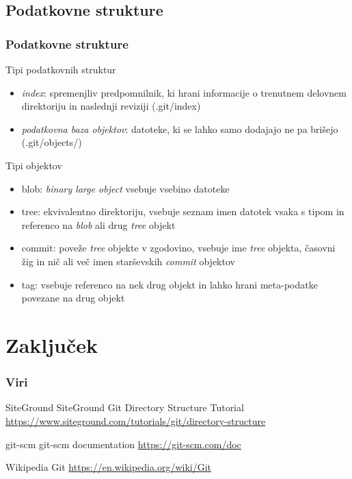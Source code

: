 \documentclass{beamer}
\begin{document}
\subsection{Podatkovne strukture}
\begin{frame}[shrink=12]
  \frametitle{Podatkovne strukture}
  \begin{block}{Tipi podatkovnih struktur}
    \begin{itemize}
      \item \emph{index}: spremenjliv predpomnilnik, ki hrani informacije o trenutnem
        delovnem direktoriju in naslednji reviziji (.git/index)
      \item \emph{podatkovna baza objektov}: datoteke, ki se lahko samo dodajajo
        ne pa brišejo (.git/objects/)
    \end{itemize}
  \end{block}
  \begin{block}{Tipi objektov}
    \begin{itemize}
      \item blob: \emph{binary large object} vsebuje vsebino datoteke
      \item tree: ekvivalentno direktoriju, vsebuje seznam imen datotek vsaka s
        tipom in referenco na \emph{blob} ali drug \emph{tree} objekt
      \item commit: poveže \emph{tree} objekte v zgodovino, vsebuje ime
        \emph{tree} objekta, časovni žig in nič ali več imen starševskih
        \emph{commit} objektov
      \item tag: vsebuje referenco na nek drug objekt in lahko hrani
        meta-podatke povezane na drug objekt
    \end{itemize}
  \end{block}
\end{frame}


\section{Zaključek}

\begin{frame}
\frametitle{Viri}
\footnotesize{
\begin{thebibliography}{99} %
   SiteGround
    \newblock SiteGround Git Directory Structure Tutorial
    \newblock \url{https://www.siteground.com/tutorials/git/directory-structure}
    \newblock [Dostopano: 30.12.2017]

   git-scm
    \newblock git-scm documentation
    \newblock \url{https://git-scm.com/doc}
    \newblock [Dostopano: 30.12.2017]

   Wikipedia
    \newblock Git
    \newblock \url{https://en.wikipedia.org/wiki/Git}
    \newblock [Dostopano: 30.12.2017]
\end{thebibliography}
}
\end{frame}
\end{document}
